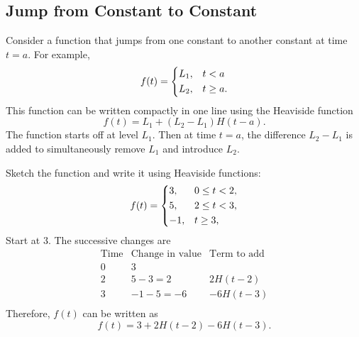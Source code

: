\documentclass[10pt,letterpaper]{article}
\begin{document}
\subsection{Jump from Constant to Constant}

Consider a function that jumps from one constant to another constant at time $t=a$. For example, 
$$
    f(t)  = \begin{dcases}
        L_1, & t<a\\
        L_2, & t\ge a.
    \end{dcases}
$$
This function can be written compactly in one line using the Heaviside function
\[
\boxed{
f(t)=L_1+(L_2-L_1)H(t-a).
}
\]
The function starts off at level $L_1$. Then at time $t=a$, the difference $L_2-L_1$ is added to simultaneously remove $L_1$ and introduce $L_2$.

\begin{example}[2]{
Sketch the function and write it using Heaviside functions:
\[
f(t)=
\begin{dcases}
3, & 0\le t<2,\\
5, & 2\le t<3,\\
-1, & t\ge3,\\
\end{dcases}
\]
}
Start at $3$. The successive changes are
\[
\begin{array}{c|c|c}
\text{Time} & \text{Change in value} & \text{Term to add}\\
\hline
0 & 3 & \\
2 & 5-3=2  & 2H(t-2)\\
3 & -1-5=-6 & -6H(t-3)\\
\end{array}
\]
Therefore, $f(t)$ can be written as 
\[
\boxed{
f(t)=3+2H(t-2)-6H(t-3).
}
\]

\begin{center}
\end{center}

\end{example}
\end{document}
